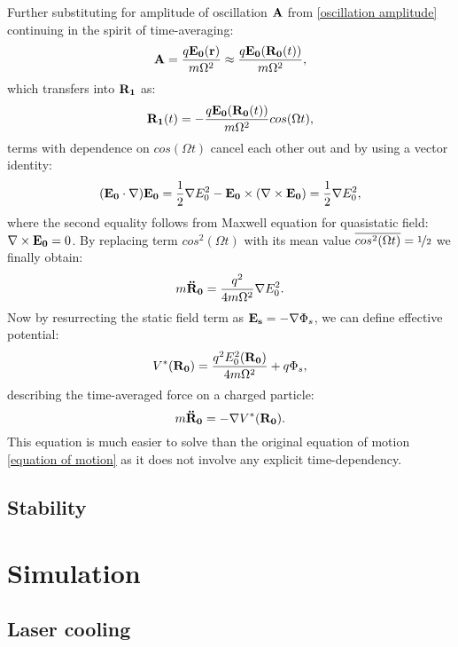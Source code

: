 Further substituting for amplitude of oscillation $\vb{A}$ from \eqref{oscillation amplitude} continuing in the spirit of time-averaging:
\begin{equation}
	\vb{A} = \frac{q \vb{E_0}(\vb{r})}{m \Omega^2} \approx \frac{q \vb{E_0}(\vb{R_0}(t))}{m \Omega^2},
\end{equation}
which transfers into $\vb{R_1}$ as:
\begin{equation}
	\vb{R_1}(t) = - \frac{q \vb{E_0}(\vb{R_0}(t))}{m \Omega^2} cos(\Omega t), 
\end{equation}
terms with dependence on $cos(\Omega t)$ cancel each other out and by using a vector identity:
\begin{equation}
	(\vb{E_0} \cdot \nabla) \vb{E_0} = \frac{1}{2} \nabla E_0^2 - \vb{E_0} \times (\nabla \times \vb{E_0}) = \frac{1}{2} \nabla E_0^2,
\end{equation}
where the second equality follows from Maxwell equation for quasistatic field: \\ $\nabla \times \vb{E_0} = 0$. By replacing term $cos^2(\Omega t)$ with its mean value $\overline{cos^2(\Omega t)} = \nicefrac{1}{2}$ we finally obtain:
\begin{equation}
	m \vb{\ddot{R}_0} = \frac{q^2}{4 m \Omega^2} \nabla E_0^2.
\end{equation}
Now by resurrecting the static field term as $\vb{E_s} = - \nabla \Phi_s$, we can define effective potential:
\begin{equation}
	\label{effective potential}
	V^*(\vb{R_0}) = \frac{q^2 E_0^2(\vb{R_0})}{4 m \Omega^2} + q \Phi_s, 
\end{equation}
describing the time-averaged force on a charged particle:
\begin{equation}
	\label{effective equation of motion}
	m \vb{\ddot{R}_0} = - \nabla V^*(\vb{R_0}). 
\end{equation}
This equation is much easier to solve than the original equation of motion \eqref{equation of motion} as it does not involve any explicit time-dependency. 

	\subsection{Stability}
	
\section{Simulation}
\label{simulation}

	\subsection{Laser cooling} 

